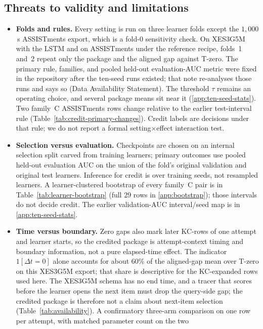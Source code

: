 \documentclass[review,12pt]{elsarticle}
\begin{document}
\subsection{Threats to validity and limitations}
\label{sec:threats}
\label{sec:limitations}
\begin{itemize}
  \item \textbf{Folds and rules.} Every setting is run on three learner
  folds except the $1{,}000$\,s ASSISTments export, which is a fold-0
  sensitivity check. On XES3G5M with the LSTM and on ASSISTments under
  the reference recipe, folds~1 and~2 repeat only the package and the
  aligned gap against T-zero. The primary rule, families, and pooled
  held-out evaluation-AUC metric were fixed in the repository after the
  ten-seed runs existed; that note re-analyses those runs and says so
  (Data Availability Statement). The threshold $\tau$ remains an
  operating choice, and several package means sit near it
  (\ref{app:ten-seed-stats}). Two family~C ASSISTments rows change
  relative to the earlier test-interval rule
  (Table~\ref{tab:credit-primary-changes}). Credit labels are decisions
  under that rule; we do not report a formal setting$\times$effect
  interaction test.
  \item \textbf{Selection versus evaluation.} Checkpoints are chosen on
  an internal selection split carved from training learners; primary
  outcomes use pooled held-out evaluation AUC on the union of the fold's
  original validation and original test learners. Inference for credit
  is over training seeds, not resampled learners. A learner-clustered
  bootstrap of every family~C pair is in
  Table~\ref{tab:learner-bootstrap} (full 29 rows in
  \ref{app:bootstrap}); those intervals do not decide credit. The
  earlier validation-AUC interval/seed map is in
  \ref{app:ten-seed-stats}.
  \item \textbf{Time versus boundary.} Zero gaps also mark later
  KC-rows of one attempt and learner starts, so the credited package
  is attempt-context timing and boundary information, not a pure
  elapsed-time effect. The indicator $1[\Delta t{=}0]$ alone accounts
  for about $60\%$ of the aligned-gap mean over T-zero on this XES3G5M
  export; that share is descriptive for the KC-expanded rows used here.
  The XES3G5M schema has no end time, and a tracer that scores before
  the learner opens the next item must drop the query-side gap; the
  credited package is therefore not a claim about next-item selection
  (Table~\ref{tab:availability}). A confirmatory three-arm comparison
  on one row per attempt, with matched parameter count on the two

\end{itemize}
\end{document}
